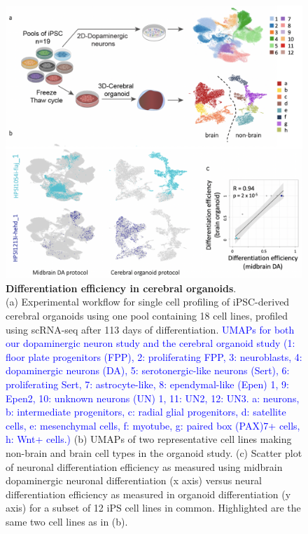 \begin{figure}[htbp]
\centering
\includegraphics[width=11.5cm]{Chapter5/Fig/neuroseq_organoids.png}
\caption[Differentiation efficiency in cerebral organoids]{\textbf{Differentiation efficiency in cerebral organoids}.\\
(a) Experimental workflow for single cell profiling of iPSC-derived cerebral organoids using one pool containing 18 cell lines, profiled using scRNA-seq after 113 days of differentiation.
\textcolor{blue}{UMAPs for both our dopaminergic neuron study and the cerebral organoid study (1: floor plate progenitors (FPP), 2: proliferating FPP, 3: neuroblasts, 4: dopaminergic neurons (DA), 5: serotonergic-like neurons (Sert), 6: proliferating Sert, 7: astrocyte-like, 8: ependymal-like (Epen) 1, 9: Epen2, 10: unknown neurons (UN) 1, 11: UN2, 12: UN3.
a: neurons, b: intermediate progenitors, c: radial glial progenitors, d: satellite cells, e: mesenchymal cells, f: myotube, g: paired box (PAX)7+ cells, h: Wnt+ cells.)}
(b) UMAPs of two representative cell lines making non-brain and brain cell types in the organoid study. 
(c) Scatter plot of neuronal differentiation efficiency as measured using midbrain dopaminergic neuronal differentiation (x axis) versus neural differentiation efficiency as measured in organoid differentiation (y axis) for a subset of 12 iPS cell lines in common. 
Highlighted are the same two cell lines as in (b).}
\label{fig:neuroseq_organoids}
\end{figure}


